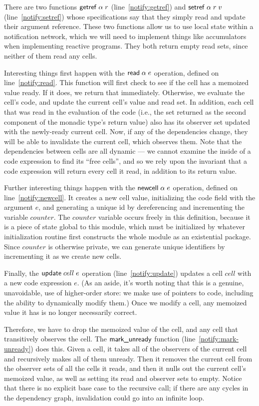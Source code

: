 \documentclass[preprint,natbib]{sigplanconf}
\begin{document}
There are two functions $\mbox{\textsf{{getref}}}\; \alpha\;r$ (line~\ref{notify:getref})
and $\mbox{\textsf{{setref}}}\; \alpha\;r\;v$ (line~\ref{notify:setref}) whose
specifications say that they simply read and update their argument
reference. These two functions allow us to use local state within a
notification network, which we will need to implement things like
accumulators when implementing reactive programs. They both return
empty read sets, since neither of them read any cells.

Interesting things first happen with the $\mbox{\textsf{{read}}}\; \alpha\;e$ operation,
defined on line~\ref{notify:read}. This function will first check
to see if the cell has a memoized value ready. If it does, we return
that immediately. Otherwise, we evaluate the cell's code, and update
the current cell's value and read set. In addition, each cell that was
read in the evaluation of the code (i.e., the set returned as the
second component of the monadic type's return value) also has its
observer set updated with the newly-ready current cell. Now, if any of
the dependencies change, they will be able to invalidate the current
cell, which observes them. Note that the dependencies between cells
are all dynamic --- we cannot examine the inside of a code expression
to find its ``free cells'', and so we rely upon the invariant that a
code expression will return every cell it read, in addition to its
return value.

Further interesting things happen with the $\mbox{\textsf{{newcell}}}\; \alpha\; e$
operation, defined on line~\ref{notify:newcell}.  It creates a new
cell value, initializing the code field with the argument $e$, and
generating a unique id by dereferencing and incrementing the variable
$counter$. The $counter$ variable occurs freely in this definition,
because it is a piece of state global to this module, which must be
initialized by whatever initialization routine first constructs the
whole module as an existential package.  Since $counter$ is otherwise
private, we can generate unique identifiers by incrementing it as we
create new cells.

Finally, the $\mbox{\textsf{{update}}}\;cell\;e$ operation (line~\ref{notify:update}) updates a cell
$cell$ with a new code expression $e$. (As an aside, it's worth
noting that this is a genuine, unavoidable, use of higher-order store:
we make use of pointers to code, including the ability to dynamically
modify them.) Once we modify a cell, any memoized value it has is no
longer necessarily correct.

Therefore, we have to drop the memoized value of the cell, and any
cell that transitively observes the cell. The $\mbox{\textsf{{mark\_unready}}}$
function (line~\ref{notify:mark-unready}) does this. Given a cell, it
takes all of the observers of the current cell and recursively makes
all of them unready. Then it removes the current cell from the
observer sets of all the cells it reads, and then it nulls out the
current cell's memoized value, as well as setting its read and
observer sets to empty. Notice that there is no explicit base case to
the recursive call; if there are any cycles in the dependency graph,
invalidation could go into an infinite loop.
\end{document}
